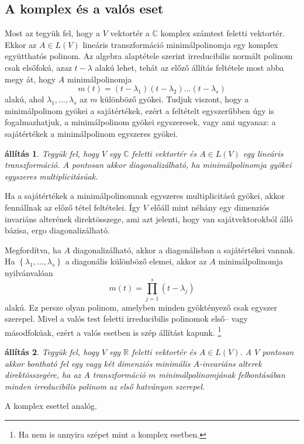 \documentclass[9pt, a4paper, showtrims]{memoir}
\makeatletter
\renewenvironment{proof}[1][\proofname]
    {\par\pushQED{\qed}%
    \normalfont \topsep6\p@\@plus6\p@\relax
    \trivlist
    \item[\hskip\labelsep
        \itshape
    #1\@addpunct{:}]\ignorespaces}
    {\popQED\endtrivlist\@endpefalse}
\theoremstyle{plain}
\newtheorem{proposition}{állítás}[chapter]
\theoremstyle{remark}
\theoremstyle{definition}
\makeatother
\begin{document}
    \subsection{A komplex és a valós eset}
    Most az tegyük fel, hogy a $V$ vektortér a $\mathbb{C}$ komplex számtest feletti vektortér.
    Ekkor az $A\in L\left( V \right)$ lineáris transzformáció minimálpolinomja egy komplex együtthatós polinom.
    Az algebra alaptétele szerint irreducibilis normált polinom csak elsőfokú, azaz $t-\lambda$ alakú lehet,
    tehát az előző állítás feltétele most abba megy át, hogy $A$ minimálpolinomja
    \[
        m\left( t \right)=\left( t-\lambda_1 \right)\left( t-\lambda_2 \right)\dots\left( t-\lambda_s \right)
    \]
    alakú, ahol $\lambda_1,\dots,\lambda_s$ az $m$ különböző gyökei.
    Tudjuk viszont, hogy a minimálpolinom gyökei a sajátértékek,
    ezért a feltételt egyszerűbben úgy is fogalmazhatjuk,
    a minimálpolinom gyökei egyszeresek, vagy ami ugyanaz: 
    a sajátértékek a minimálpolinom egyszeres gyökei.
    \begin{proposition}
        Tegyük fel, hogy $V$ egy $\mathbb{C}$ feletti vektortér és $A\in L\left( V \right)$ egy lineáris transzformáció.
        $A$ pontosan akkor diagonalizálható,
        ha minimálpolinomja gyökei egyszeres multiplicitásúak.
    \end{proposition}
    \begin{proof}
        Ha a sajátértékek a minimálpolinomnak egyszeres multiplicitású gyökei,
        akkor fennállnak az előző tétel feltételei.
        Így $V$ előáll mint néhány egy dimenziós invariáns alterének direktösszege,
        ami azt jelenti, hogy van sajátvektorokból álló bázisa, ergo diagonalizálható.

        Megfordítva, ha $A$ diagonalizálható, akkor a diagonálisban a sajátértékei vannak.
        Ha $\left\{ \lambda_1,\dots,\lambda_s \right\}$ a diagonális különböző elemei,
        akkor az $A$ minimálpolinomja nyilvánvalóan
        \[
            m\left( t \right)
            =
            \prod_{j=1}^s\left( t-\lambda_j \right)
        \]
        alakú.
        Ez persze olyan polinom, 
        amelyben minden gyöktényező csak egyszer szerepel.
    \end{proof}
    Mivel a valós test feletti irreducibilis polinomok első-- vagy másodfokúak, 
    ezért a valós esetben is szép állítást kapunk.
    \footnote{Ha nem is annyira szépet mint a komplex esetben.}
    \begin{proposition}
        Tegyük fel, hogy $V$ egy $\mathbb{R}$ feletti vektortér és $A\in L\left( V \right)$.
        A $V$ pontosan akkor bontható fel egy vagy két dimenziós minimális $A$-invariáns alterek direktösszegére,
        ha az $A$ transzformáció $m$ 
        minimálpolinomjának felbontásában minden irreducibilis polinom az első hatványon szerepel.
    \end{proposition}
    \begin{proof}
        A komplex esettel analóg.
    \end{proof}
\end{document}
